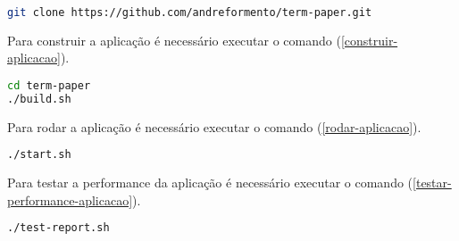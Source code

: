 \begin{lstlisting}[language=bash,label=comando-git,caption=Como fazer o download do código fonte com o Git]
git clone https://github.com/andreformento/term-paper.git
\end{lstlisting}

Para construir a aplicação é necessário executar o comando
(\autoref{construir-aplicacao}).

\begin{lstlisting}[language=bash,label=construir-aplicacao,caption=Como construir a aplicação]
cd term-paper
./build.sh
\end{lstlisting}

Para rodar a aplicação é necessário executar o comando
(\autoref{rodar-aplicacao}).

\begin{lstlisting}[language=bash,label=rodar-aplicacao,caption=Como rodar a aplicação]
./start.sh
\end{lstlisting}

Para testar a performance da aplicação é necessário executar o comando
(\autoref{testar-performance-aplicacao}).

\begin{lstlisting}[language=bash,label=testar-performance-aplicacao,caption=Como testar a performance da aplicação]
./test-report.sh
\end{lstlisting}





